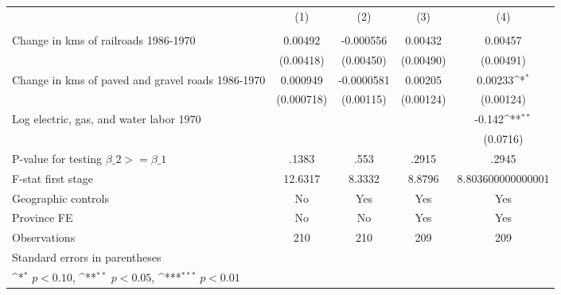 {
\def\sym#1{\ifmmode^{#1}\else\(^{#1}\)\fi}
\begin{tabular}{l*{4}{c}}
\hline\hline
                &\multicolumn{1}{c}{(1)}&\multicolumn{1}{c}{(2)}&\multicolumn{1}{c}{(3)}&\multicolumn{1}{c}{(4)}\\
                &\multicolumn{1}{c}{}&\multicolumn{1}{c}{}&\multicolumn{1}{c}{}&\multicolumn{1}{c}{}\\
\hline
Change in kms of railroads 1986-1970&  0.00492         &-0.000556         &  0.00432         &  0.00457         \\
                &(0.00418)         &(0.00450)         &(0.00490)         &(0.00491)         \\
[1em]
Change in kms of paved and gravel roads 1986-1970& 0.000949         &-0.0000581         &  0.00205         &  0.00233\sym{*}  \\
                &(0.000718)         &(0.00115)         &(0.00124)         &(0.00124)         \\
[1em]
Log electric, gas, and water labor 1970&                  &                  &                  &   -0.142\sym{**} \\
                &                  &                  &                  & (0.0716)         \\
\hline
P-value for testing $\beta\_{2} >= \beta\_{1}$&    .1383         &     .553         &    .2915         &    .2945         \\
F-stat first stage&  12.6317         &   8.3332         &   8.8796         &8.803600000000001         \\
Geographic controls&       No         &      Yes         &      Yes         &      Yes         \\
Province FE     &       No         &       No         &      Yes         &      Yes         \\
Observations    &      210         &      210         &      209         &      209         \\
\hline\hline
\multicolumn{5}{l}{\footnotesize Standard errors in parentheses}\\
\multicolumn{5}{l}{\footnotesize \sym{*} \(p<0.10\), \sym{**} \(p<0.05\), \sym{***} \(p<0.01\)}\\
\end{tabular}
}
